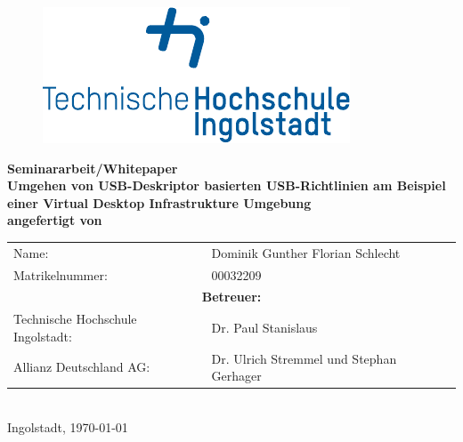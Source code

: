 
\begin{titlepage}

\phantom{tmpText}

\vspace{1cm}

\begin{figure}[h!]
\centering
\includegraphics[width=\textwidth]{bilder/thi_logo_cropped.pdf}
\end{figure}

  \begin{center}

    
    
    \textbf{{\large Seminararbeit/Whitepaper} \\[3ex]
    {\LARGE Umgehen von USB-Deskriptor basierten USB-Richtlinien am Beispiel einer Virtual Desktop Infrastrukture Umgebung} \\[1ex]
    \vfill
    angefertigt von} \\
    \begin{tabular}{ll}
    	Name: & Dominik Gunther Florian Schlecht\\
    	Matrikelnummer: & 00032209\\[2ex]
    	\multicolumn{2}{c}{\textbf{Betreuer:}}\\
    	Technische Hochschule Ingolstadt: & Dr. Paul Stanislaus \\
      Allianz Deutschland AG: & Dr. Ulrich Stremmel und Stephan Gerhager
    \end{tabular}\\[2ex] %
    \vfill
    Ingolstadt, \today
  \end{center}
\end{titlepage}
